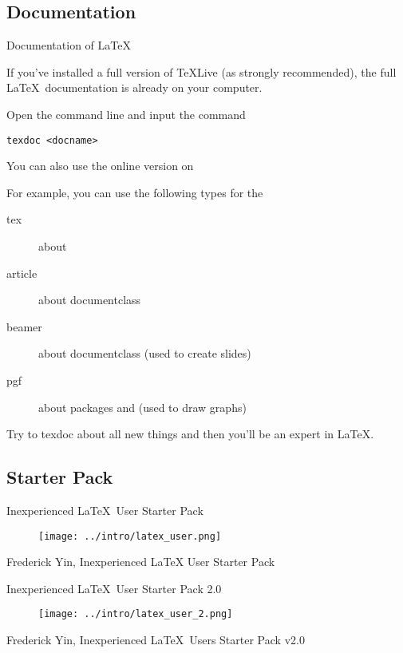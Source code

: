 \subsection{Documentation}

\begin{frame}[fragile]{Documentation of \LaTeX}

    If you've installed a full version of \TeX Live (as strongly recommended), the full \LaTeX\ documentation is already on your computer. \medskip

    Open the command line and input the command

    \begin{verbatim}
texdoc <docname>
    \end{verbatim}

    You can also use the online version on  \medskip

    For example, you can use the following types for the 
    \begin{description}
        \item[tex] 		about \structure{\TeX}
        \item[article] 	about documentclass 
        \item[beamer] 	about documentclass  (used to create slides)
        \item[pgf]		about packages  and  (used to draw graphs)
    \end{description}
    \smallskip
    Try to \alert{texdoc} about all new things and then you'll be an expert in \LaTeX.
\end{frame}

\subsection*{Starter Pack}

\begin{frame}{Inexperienced \LaTeX\  User Starter Pack}
    \begin{figure}[h]
        \centering
        \texttt{[image: ../intro/latex\_user.png]}
    \end{figure}
    \tiny{Frederick Yin, Inexperienced LaTeX User Starter Pack}
\end{frame}

\begin{frame}{Inexperienced \LaTeX\  User Starter Pack 2.0}
    \begin{figure}[h]
        \centering
        \texttt{[image: ../intro/latex\_user\_2.png]}
    \end{figure}
    \tiny{Frederick Yin, Inexperienced \LaTeX\  Users Starter Pack v2.0}
\end{frame}
